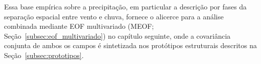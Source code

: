 Essa base empírica sobre a precipitação, em particular a descrição por fases da separação espacial entre vento e chuva, fornece o alicerce para a análise combinada mediante EOF multivariado (MEOF; Seção~\ref{subsec:eof_multivariado}) no capítulo seguinte, onde a covariância conjunta de ambos os campos é sintetizada nos protótipos estruturais descritos na Seção~\ref{subsec:prototipos}.
